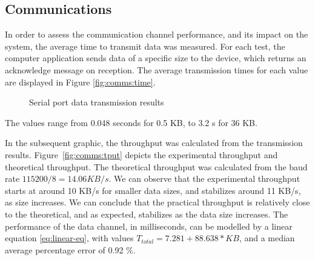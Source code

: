 \subsection{Communications}\label{chap:evaluation:performance:comms}

In order to assess the communication channel performance, and its impact on the system, the average time to transmit data was measured. For each test, the computer application sends data of a specific size to the device, which returns an acknowledge message on reception.
The average transmission times for each value are displayed in Figure \ref{fig:comms:time}.
\begin{figure}[h!]
	\centering     %
	\caption{Serial port data transmission results}
\end{figure}
The values range from 0.048 seconds for 0.5 KB, to 3.2 s for 36 KB.

In the subsequent graphic, the throughput was calculated from the transmission results.
Figure~\ref{fig:comms:tput} depicts the experimental throughput and theoretical throughput. The theoretical throughput was calculated from the baud rate \(115200/8 = 14.06 KB/s\).
We can observe that the experimental throughput starts at around 10 KB/s for smaller data sizes, and stabilizes around 11 KB/s, as size increases.
We can conclude that the practical throughput is relatively close to the theoretical, and as expected, stabilizes as the data size increases.
The performance of the data channel, in milliseconds, can be modelled by a linear equation \ref{eq:linear-eq}, with values \(T_{total} = 7.281 + 88.638 * KB\), and a median average percentage error of 0.92 \%.

